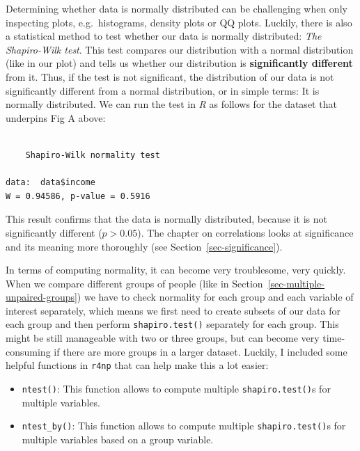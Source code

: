 \documentclass[
  letterpaper,
  DIV=11,
  numbers=noendperiod]{scrreprt}
\newenvironment{Shaded}{\begin{snugshade}}{\end{snugshade}}
\newcommand{\FunctionTok}[1]{\textcolor[rgb]{0.28,0.35,0.67}{#1}}
\newcommand{\NormalTok}[1]{\textcolor[rgb]{0.00,0.23,0.31}{#1}}
\newcommand{\SpecialCharTok}[1]{\textcolor[rgb]{0.37,0.37,0.37}{#1}}
\begin{document}
Determining whether data is normally distributed can be challenging when
only inspecting plots, e.g.~histograms, density plots or QQ plots.
Luckily, there is also a statistical method to test whether our data is
normally distributed: \emph{The Shapiro-Wilk test}. This test compares
our distribution with a normal distribution (like in our plot) and tells
us whether our distribution is \textbf{significantly different} from it.
Thus, if the test is not significant, the distribution of our data is
not significantly different from a normal distribution, or in simple
terms: It is normally distributed. We can run the test in \emph{R} as
follows for the dataset that underpins Fig A above:

\begin{Shaded}
\end{Shaded}

\begin{verbatim}

    Shapiro-Wilk normality test

data:  data$income
W = 0.94586, p-value = 0.5916
\end{verbatim}

This result confirms that the data is normally distributed, because it
is not significantly different (\(p > 0.05\)). The chapter on
correlations looks at significance and its meaning more thoroughly (see
Section~\ref{sec-significance}).

In terms of computing normality, it can become very troublesome, very
quickly. When we compare different groups of people (like in
Section~\ref{sec-multiple-unpaired-groups}) we have to check normality
for each group and each variable of interest separately, which means we
first need to create subsets of our data for each group and then perform
\texttt{shapiro.test()} separately for each group. This might be still
manageable with two or three groups, but can become very time-consuming
if there are more groups in a larger dataset. Luckily, I included some
helpful functions in \texttt{r4np} that can help make this a lot easier:

\begin{itemize}
\item
  \texttt{ntest()}: This function allows to compute multiple
  \texttt{shapiro.test()}s for multiple variables.
\item
  \texttt{ntest\_by()}: This function allows to compute multiple
  \texttt{shapiro.test()}s for multiple variables based on a group
  variable.
\end{itemize}
\end{document}

